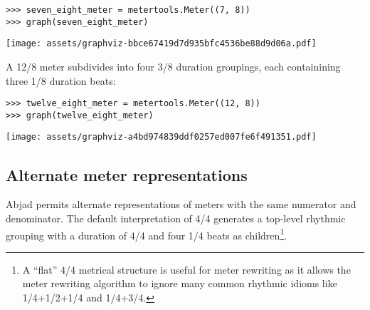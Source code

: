 \begin{comment}
<abjad>
seven_eight_meter = metertools.Meter((7, 8))
graph(seven_eight_meter)
</abjad>
\end{comment}

\begin{singlespacing}
\vspace{-0.5\baselineskip}
\begin{lstlisting}
>>> seven_eight_meter = metertools.Meter((7, 8))
>>> graph(seven_eight_meter)
\end{lstlisting}
\noindent\texttt{[image: assets/graphviz-bbce67419d7d935bfc4536be88d9d06a.pdf]}
\end{singlespacing}

\noindent A 12/8 meter subdivides into four 3/8 duration groupings, each
containining three 1/8 duration beats:

\begin{comment}
<abjad>
twelve_eight_meter = metertools.Meter((12, 8))
graph(twelve_eight_meter)
</abjad>
\end{comment}

\begin{singlespacing}
\vspace{-0.5\baselineskip}
\begin{lstlisting}
>>> twelve_eight_meter = metertools.Meter((12, 8))
>>> graph(twelve_eight_meter)
\end{lstlisting}
\noindent\texttt{[image: assets/graphviz-a4bd974839ddf0257ed007fe6f491351.pdf]}
\end{singlespacing}

\subsection{Alternate meter representations} %

Abjad permits alternate representations of meters with the same numerator and
denominator. The default interpretation of 4/4 generates a top-level rhythmic
grouping with a duration of 4/4 and four 1/4 beats as children\footnote{A
\enquote{flat} 4/4 metrical structure is useful for meter rewriting as it
allows the meter rewriting algorithm to ignore many common rhythmic idioms like
1/4+1/2+1/4 and 1/4+3/4.}.

\begin{comment}
<abjad>
four_four_meter = metertools.Meter((4, 4))
graph(four_four_meter)
</abjad>
\end{comment}


